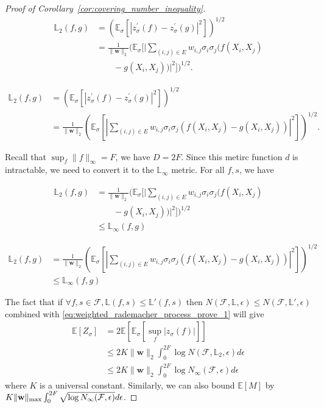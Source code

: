 \documentclass[letterpaper]{article} %
\def\DoubleColumn{}
\def\DoubleColumnEnd{}
\def\SingleColumn{}
\def\SingleColumnEnd{}
\newcommand{\E}{\mathbb{E}}
\newcommand{\weight}{\mathbf{w}}
\newcommand{\rademacher}{\sigma}
\newcommand{\pair}[1]{(#1)}
\newcommand{\lebesgue}{\mathbb{L}}
\begin{document}
\begin{proof}[Proof of Corollary~\ref{cor:covering_number_inequality}]
\begin{align*}
    \lebesgue{}_2(f,g)&=(\E_\rademacher[|z^\prime_\rademacher(f)-z^\prime_\rademacher(g)|^2])^{1/2}\\
    &=\frac{1}{\|\weight{}\|_2}(\E_\rademacher[|\sum_{\pair{i,j}\in E}w_{i,j}\rademacher_i\rademacher_j(f(X_i,X_j)\\
    &\qquad-g(X_i,X_j))|^2])^{1/2}.
\end{align*}
\DoubleColumnEnd
\SingleColumn
\begin{align*}
    \lebesgue{}_2(f,g)&=(\E_\rademacher[|z^\prime_\rademacher(f)-z^\prime_\rademacher(g)|^2])^{1/2}\\
    &=\frac{1}{\|\weight{}\|_2}(\E_\rademacher[|\sum_{\pair{i,j}\in E}w_{i,j}\rademacher_i\rademacher_j(f(X_i,X_j)-g(X_i,X_j))|^2])^{1/2}.
\end{align*}
\SingleColumnEnd
Recall that $\sup_f \|f\|_\infty = F$, we have $D= 2F$.
Since this metirc function $d$ is intractable, we need to convert it to the $\lebesgue_\infty$ metric. For all $f,s$, we have
\DoubleColumn
\begin{align*}
    \lebesgue{}_2(f,g)&=\frac{1}{\|\weight{}\|_2}(\E_\rademacher[|\sum_{\pair{i,j}\in E}w_{i,j}\rademacher_i\rademacher_j(f(X_i,X_j)\\
    &\qquad-g(X_i,X_j))|^2])^{1/2}\\
    &\le \lebesgue_\infty(f,g)
\end{align*}
\DoubleColumnEnd
\SingleColumn
\begin{align*}
    \lebesgue{}_2(f,g)&=\frac{1}{\|\weight{}\|_2}(\E_\rademacher[|\sum_{\pair{i,j}\in E}w_{i,j}\rademacher_i\rademacher_j(f(X_i,X_j)-g(X_i,X_j))|^2])^{1/2}\\
    &\le \lebesgue_\infty(f,g)
\end{align*}
\SingleColumnEnd
The fact that if $\forall f,s\in\mathcal F, \lebesgue{}(f,s)\le \lebesgue{}'(f,s)$ then $N(\mathcal F,\lebesgue{},\epsilon)\le N(\mathcal F, \lebesgue{}',\epsilon)$ combined with \eqref{eq:weighted_rademacher_process_prove_1} will give
\begin{align*}
    \E[Z_\rademacher]&= 2\E[\E_\rademacher[\sup_f|z_\rademacher(f)|]]\\
    &\le 2K\|\weight{}\|_2\int_0^{2F}\log N(\mathcal F,\lebesgue{}_2,\epsilon)d\epsilon\\
    &\le 2K\|\weight{}\|_2\int_0^{2F}\log N_\infty(\mathcal F, \epsilon)d\epsilon
\end{align*}
where $K$ is a universal constant. Similarly, we can also bound $\E[M]$ by $K\|\weight{}\|_{\max}\linebreak\int_0^{2F}\sqrt{\log N_\infty(\mathcal F, \epsilon)}d\epsilon$. 

\end{proof}
\end{document}
